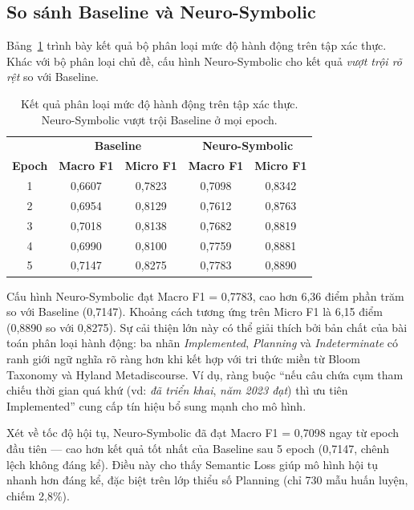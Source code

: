 \subsection{So sánh Baseline và Neuro-Symbolic}
\label{subsec:action_baseline_vs_neuro}

Bảng~\ref{tab:action_val} trình bày kết quả bộ phân loại mức độ hành động trên tập xác thực. Khác với bộ phân loại chủ đề, cấu hình Neuro-Symbolic cho kết quả \textit{vượt trội rõ rệt} so với Baseline.

\begin{table}[H]
\centering
\caption{Kết quả phân loại mức độ hành động trên tập xác thực. Neuro-Symbolic vượt trội Baseline ở mọi epoch.}
\label{tab:action_val}
\begin{tabular}{c|cc|cc}
\toprule
 & \multicolumn{2}{c|}{\textbf{Baseline}} & \multicolumn{2}{c}{\textbf{Neuro-Symbolic}} \\
\textbf{Epoch} & \textbf{Macro F1} & \textbf{Micro F1} & \textbf{Macro F1} & \textbf{Micro F1} \\
\midrule
1 & 0,6607 & 0,7823 & 0,7098 & 0,8342 \\
2 & 0,6954 & 0,8129 & 0,7612 & 0,8763 \\
3 & 0,7018 & 0,8138 & 0,7682 & 0,8819 \\
4 & 0,6990 & 0,8100 & 0,7759 & 0,8881 \\
5 & 0,7147 & 0,8275 & 0,7783 & 0,8890 \\
\bottomrule
\end{tabular}
\end{table}

Cấu hình Neuro-Symbolic đạt Macro F1 = 0,7783, cao hơn 6,36 điểm phần trăm so với Baseline (0,7147). Khoảng cách tương ứng trên Micro F1 là 6,15 điểm (0,8890 so với 0,8275). Sự cải thiện lớn này có thể giải thích bởi bản chất của bài toán phân loại hành động: ba nhãn \textit{Implemented}, \textit{Planning} và \textit{Indeterminate} có ranh giới ngữ nghĩa rõ ràng hơn khi kết hợp với tri thức miền từ Bloom Taxonomy và Hyland Metadiscourse. Ví dụ, ràng buộc ``nếu câu chứa cụm tham chiếu thời gian quá khứ (vd: \textit{đã triển khai}, \textit{năm 2023 đạt}) thì ưu tiên Implemented'' cung cấp tín hiệu bổ sung mạnh cho mô hình.

Xét về tốc độ hội tụ, Neuro-Symbolic đã đạt Macro F1 = 0,7098 ngay từ epoch đầu tiên --- cao hơn kết quả tốt nhất của Baseline sau 5 epoch (0,7147, chênh lệch không đáng kể). Điều này cho thấy Semantic Loss giúp mô hình hội tụ nhanh hơn đáng kể, đặc biệt trên lớp thiểu số Planning (chỉ 730 mẫu huấn luyện, chiếm 2,8\%).

